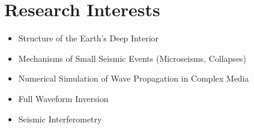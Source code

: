\section*{Research Interests}

\begin{itemize}
\item Structure of the Earth's Deep Interior
\item Mechanisms of Small Seismic Events (Microseisms, Collapses)
\item Numerical Simulation of Wave Propagation in Complex Media
\item Full Waveform Inversion
\item Seismic Interferometry
\end{itemize}
